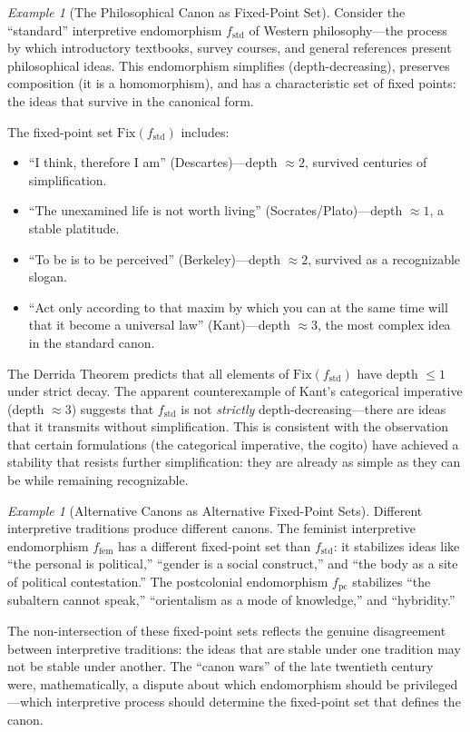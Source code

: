 \documentclass[11pt,openany]{book}
\theoremstyle{definition}
\theoremstyle{plain}
\theoremstyle{remark}
\newtheorem{example}[axiom]{Example}
\begin{document}
\begin{example}[The Philosophical Canon as Fixed-Point Set]
Consider the ``standard'' interpretive endomorphism $f_{\text{std}}$ of Western philosophy---the process by which introductory textbooks, survey courses, and general references present philosophical ideas. This endomorphism simplifies (depth-decreasing), preserves composition (it is a homomorphism), and has a characteristic set of fixed points: the ideas that survive in the canonical form. 

The fixed-point set $\mathrm{Fix}(f_{\text{std}})$ includes:
\begin{itemize}
\item ``I think, therefore I am'' (Descartes)---depth $\approx 2$, survived centuries of simplification.
\item ``The unexamined life is not worth living'' (Socrates/Plato)---depth $\approx 1$, a stable platitude.
\item ``To be is to be perceived'' (Berkeley)---depth $\approx 2$, survived as a recognizable slogan.
\item ``Act only according to that maxim by which you can at the same time will that it become a universal law'' (Kant)---depth $\approx 3$, the most complex idea in the standard canon.
\end{itemize}

The Derrida Theorem predicts that all elements of $\mathrm{Fix}(f_{\text{std}})$ have depth $\leq 1$ under strict decay. The apparent counterexample of Kant's categorical imperative (depth $\approx 3$) suggests that $f_{\text{std}}$ is not \emph{strictly} depth-decreasing---there are ideas that it transmits without simplification. This is consistent with the observation that certain formulations (the categorical imperative, the cogito) have achieved a stability that resists further simplification: they are already as simple as they can be while remaining recognizable.
\end{example}

\begin{example}[Alternative Canons as Alternative Fixed-Point Sets]
Different interpretive traditions produce different canons. The feminist interpretive endomorphism $f_{\text{fem}}$ has a different fixed-point set than $f_{\text{std}}$: it stabilizes ideas like ``the personal is political,'' ``gender is a social construct,'' and ``the body as a site of political contestation.'' The postcolonial endomorphism $f_{\text{pc}}$ stabilizes ``the subaltern cannot speak,'' ``orientalism as a mode of knowledge,'' and ``hybridity.''

The non-intersection of these fixed-point sets reflects the genuine disagreement between interpretive traditions: the ideas that are stable under one tradition may not be stable under another. The ``canon wars'' of the late twentieth century were, mathematically, a dispute about which endomorphism should be privileged---which interpretive process should determine the fixed-point set that defines the canon.
\end{example}
\end{document}
